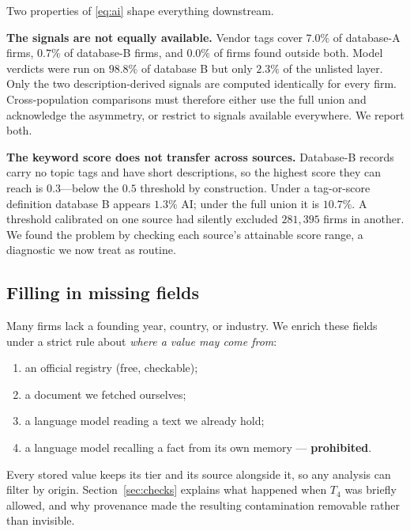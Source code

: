 \documentclass[11pt]{article}
\begin{document}
Two properties of \eqref{eq:ai} shape everything downstream.

\textbf{The signals are not equally available.} Vendor tags cover $7.0\%$ of
database-A firms, $0.7\%$ of database-B firms, and $0.0\%$ of firms found
outside both. Model verdicts were run on $98.8\%$ of database B but only
$2.3\%$ of the unlisted layer. Only the two description-derived signals are
computed identically for every firm. Cross-population comparisons must
therefore either use the full union and acknowledge the asymmetry, or restrict
to signals available everywhere. We report both.

\textbf{The keyword score does not transfer across sources.} Database-B records
carry no topic tags and have short descriptions, so the highest score they can
reach is $0.3$---below the $0.5$ threshold by construction. Under a
tag-or-score definition database B appears $1.3\%$ AI; under the full union it
is $10.7\%$. A threshold calibrated on one source had silently excluded
$281{,}395$ firms in another. We found the problem by checking each source's
attainable score range, a diagnostic we now treat as routine.

\subsection{Filling in missing fields}

Many firms lack a founding year, country, or industry. We enrich these fields
under a strict rule about \emph{where a value may come from}:

\begin{enumerate}[leftmargin=2.2em, itemsep=2pt]
  \item[$T_1$] an official registry (free, checkable);
  \item[$T_2$] a document we fetched ourselves;
  \item[$T_3$] a language model reading a text we already hold;
  \item[$T_4$] a language model recalling a fact from its own memory ---
        \textbf{prohibited}.
\end{enumerate}

Every stored value keeps its tier and its source alongside it, so any analysis
can filter by origin. Section~\ref{sec:checks} explains what happened when
$T_4$ was briefly allowed, and why provenance made the resulting contamination
removable rather than invisible.


\end{document}
